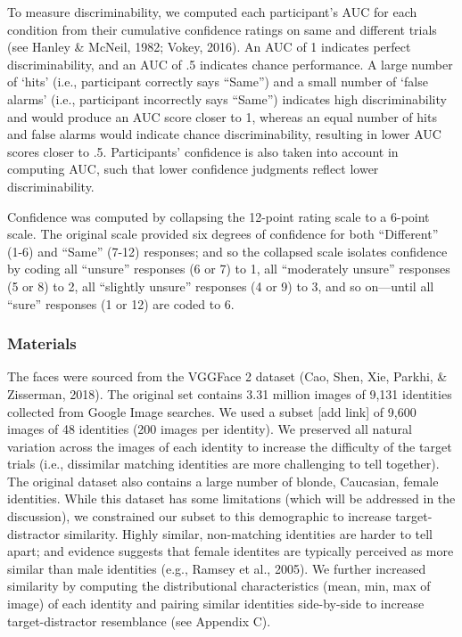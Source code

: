 \documentclass[
  english,
  man]{apa6}
\begin{document}
To measure discriminability, we computed each participant's AUC for each condition from their cumulative confidence ratings on same and different trials (see Hanley \& McNeil, 1982; Vokey, 2016). An AUC of 1 indicates perfect discriminability, and an AUC of .5 indicates chance performance. A large number of `hits' (i.e., participant correctly says ``Same'') and a small number of `false alarms' (i.e., participant incorrectly says ``Same'') indicates high discriminability and would produce an AUC score closer to 1, whereas an equal number of hits and false alarms would indicate chance discriminability, resulting in lower AUC scores closer to .5. Participants' confidence is also taken into account in computing AUC, such that lower confidence judgments reflect lower discriminability.

Confidence was computed by collapsing the 12-point rating scale to a 6-point scale. The original scale provided six degrees of confidence for both ``Different'' (1-6) and ``Same'' (7-12) responses; and so the collapsed scale isolates confidence by coding all ``unsure'' responses (6 or 7) to 1, all ``moderately unsure'' responses (5 or 8) to 2, all ``slightly unsure'' responses (4 or 9) to 3, and so on---until all ``sure'' responses (1 or 12) are coded to 6.

\hypertarget{materials}{%
\subsubsection{Materials}\label{materials}}

The faces were sourced from the VGGFace 2 dataset (Cao, Shen, Xie, Parkhi, \& Zisserman, 2018). The original set contains 3.31 million images of 9,131 identities collected from Google Image searches. We used a subset {[}add link{]} of 9,600 images of 48 identities (200 images per identity). We preserved all natural variation across the images of each identity to increase the difficulty of the target trials (i.e., dissimilar matching identities are more challenging to tell together). The original dataset also contains a large number of blonde, Caucasian, female identities. While this dataset has some limitations (which will be addressed in the discussion), we constrained our subset to this demographic to increase target-distractor similarity. Highly similar, non-matching identities are harder to tell apart; and evidence suggests that female identites are typically perceived as more similar than male identities (e.g., Ramsey et al., 2005). We further increased similarity by computing the distributional characteristics (mean, min, max of image) of each identity and pairing similar identities side-by-side to increase target-distractor resemblance (see Appendix C).
\end{document}

